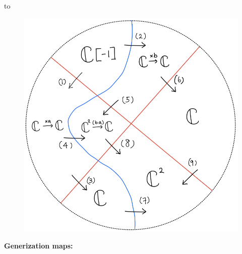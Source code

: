 to
\begin{figure}[H]
    \centering
    \includegraphics[scale = 0.45]{diagrams/lemma4/33.png}
    \caption{}
    \label{fig:your-label}
\end{figure}
\textbf{Generization maps:}
